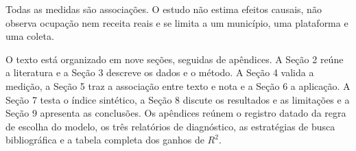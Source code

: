 Todas as medidas são associações. O estudo não estima efeitos causais, não observa ocupação nem receita reais e se limita a um município, uma plataforma e uma coleta.

O texto está organizado em nove seções, seguidas de apêndices. A Seção 2 reúne a literatura e a Seção 3 descreve os dados e o método. A Seção 4 valida a medição, a Seção 5 traz a associação entre texto e nota e a Seção 6 a aplicação. A Seção 7 testa o índice sintético, a Seção 8 discute os resultados e as limitações e a Seção 9 apresenta as conclusões. Os apêndices reúnem o registro datado da regra de escolha do modelo, os três relatórios de diagnóstico, as estratégias de busca bibliográfica e a tabela completa dos ganhos de $R^2$.
